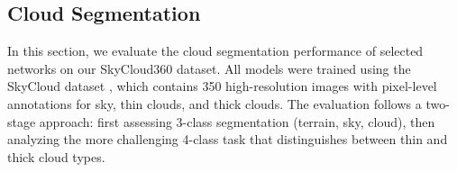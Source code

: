 \documentclass[conference]{IEEEtran}
\begin{document}
        
\subsection{Cloud Segmentation}


In this section, we evaluate the cloud segmentation performance of selected networks on our SkyCloud360 dataset.
All models were trained using the SkyCloud dataset \cite{gerhardt2023skycloud}, which contains 350 high-resolution images with pixel-level annotations for sky, thin clouds, and thick clouds.
The evaluation follows a two-stage approach: first assessing 3-class segmentation (terrain, sky, cloud), then analyzing the more challenging 4-class task that distinguishes between thin and thick cloud types.
\end{document}
